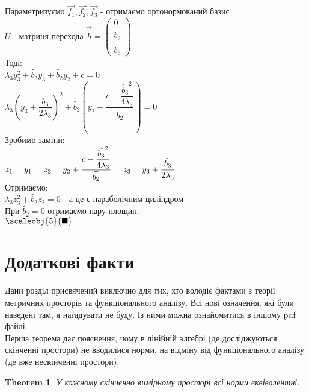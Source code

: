 \documentclass[a4paper, 10pt]{article}
\theoremstyle{theoremdd}
\newtheorem{theorem}{Theorem}[subsection]
\begin{document}
Параметризуємо $\vec{f_1}, \vec{f_2}, \vec{f_3}$ - отримаємо ортонормований базис\\
$U$ - матриця перехода $\vec{\widetilde{b}} = \begin{pmatrix}
0 \\ \widetilde{b_2} \\ \widetilde{b_3}
\end{pmatrix}$\\
Тоді:\\
$\lambda_3 y_3^2 + \widetilde{b_3} y_3 + \widetilde{b_2} y_2 + c = 0$\\
$\lambda_3 \left(y_3 + \dfrac{\widetilde{b_3}}{2 \lambda_3} \right)^2 + \widetilde{b_2} \left(y_2 + \dfrac{c - \dfrac{\widetilde{b_3}^2}{4\lambda_3}}{\widetilde{b_2}} \right) = 0$\\
Зробимо заміни:\\
$z_1 = y_1 \hspace{0.5cm}
z_2 = y_2 + \dfrac{c - \dfrac{\widetilde{b_3}^2}{4\lambda_3}}{\widetilde{b_2}} \hspace{0.5cm}
z_3 = y_3 + \dfrac{\widetilde{b_3}}{2 \lambda_3}
$\\
Отримаємо:\\
$\lambda_3 z_3^2 + \widetilde{b_2} z_2 = 0$ - а це є параболічним циліндром\\
При $\widetilde{b_2} = 0$ отримаємо пару площин.\\
$\scaleobj{5}{\blacksquare}$
\newpage

\section{Додаткові факти}
Дани розділ присвячений виключно для тих, хто володіє фактами з теорії метричних просторів та функціонального аналізу. Всі нові означення, які були наведені там, я нагадувати не буду. Із ними можна ознайомитися в іншому pdf файлі.
\bigskip \\
Перша теорема дає пояснення, чому в лінійній алгебрі (де досліджуються скінченні простори) не вводилися норми, на відміну від функціонального аналізу (де вже нескінченні простори).
\begin{theorem}
У кожному скінченно вимірному просторі всі норми еквівалентні.
\end{theorem}
\end{document}
